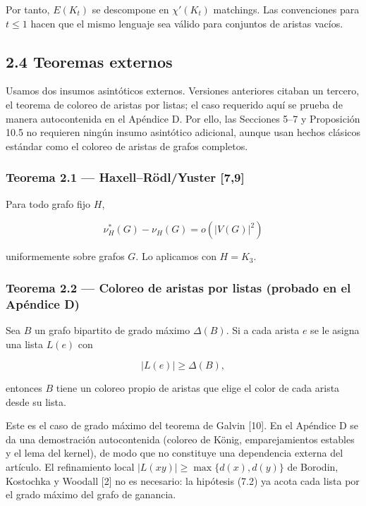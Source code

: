 \documentclass[
  11pt,
]{article}
\begin{document}
Por tanto, \(E(K_t)\) se descompone en \(\chi'(K_t)\) matchings. Las convenciones para \(t\le1\) hacen que el mismo lenguaje sea válido para conjuntos de aristas vacíos.

\subsection{2.4 Teoremas externos}\label{teoremas-externos}

Usamos dos insumos asintóticos externos. Versiones anteriores citaban un tercero, el teorema de coloreo de aristas por listas; el caso requerido aquí se prueba de manera autocontenida en el Apéndice D. Por ello, las Secciones 5--7 y Proposición 10.5 no requieren ningún insumo asintótico adicional, aunque usan hechos clásicos estándar como el coloreo de aristas de grafos completos.

\subsubsection{Teorema 2.1 --- Haxell--Rödl/Yuster {[}7,9{]}}\label{teorema-2.1-haxellruxf6dlyuster-79}

Para todo grafo fijo \(H\),

\[
\nu_H^*(G)-\nu_H(G)=o(|V(G)|^2)
\]

uniformemente sobre grafos \(G\). Lo aplicamos con \(H=K_3\).

\subsubsection{Teorema 2.2 --- Coloreo de aristas por listas (probado en el Apéndice D)}\label{teorema-2.2-coloreo-de-aristas-por-listas-probado-en-el-apuxe9ndice-d}

Sea \(B\) un grafo bipartito de grado máximo \(\Delta(B)\). Si a cada arista \(e\) se le asigna una lista \(L(e)\) con

\[
|L(e)|\ge\Delta(B),
\]

entonces \(B\) tiene un coloreo propio de aristas que elige el color de cada arista desde su lista.

Este es el caso de grado máximo del teorema de Galvin {[}10{]}. En el Apéndice D se da una demostración autocontenida (coloreo de König, emparejamientos estables y el lema del kernel), de modo que no constituye una dependencia externa del artículo. El refinamiento local \(|L(xy)|\ge\max\{d(x),d(y)\}\) de Borodin, Kostochka y Woodall {[}2{]} no es necesario: la hipótesis (7.2) ya acota cada lista por el grado máximo del grafo de ganancia.
\end{document}
